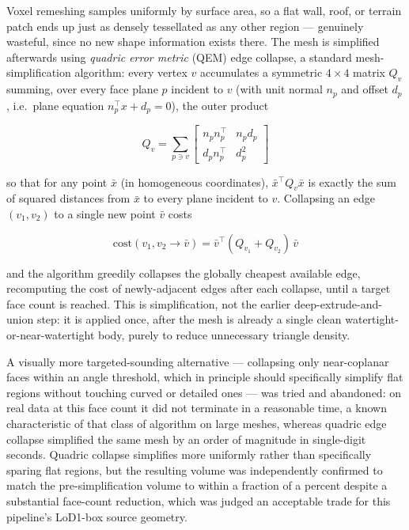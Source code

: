 \documentclass[11pt]{article}
\begin{document}
Voxel remeshing samples uniformly by surface area, so a flat wall, roof, or terrain patch ends
up just as densely tessellated as any other region --- genuinely wasteful, since no new shape
information exists there. The mesh is simplified afterwards using \emph{quadric error metric}
(QEM) edge collapse, a standard mesh-simplification algorithm: every vertex $v$ accumulates a
symmetric $4\times4$ matrix $Q_v$ summing, over every face plane $p$ incident to $v$ (with unit
normal $n_p$ and offset $d_p$, i.e.\ plane equation $n_p^\top x + d_p = 0$), the outer product

\begin{equation}
  Q_v = \sum_{p \ni v} \begin{bmatrix} n_p n_p^\top & n_p d_p \\ d_p n_p^\top & d_p^2 \end{bmatrix}
\end{equation}

so that for any point $\bar{x}$ (in homogeneous coordinates), $\bar{x}^\top Q_v \bar{x}$ is
exactly the sum of squared distances from $\bar{x}$ to every plane incident to $v$. Collapsing
an edge $(v_1, v_2)$ to a single new point $\bar{v}$ costs

\begin{equation}
  \mathrm{cost}(v_1, v_2 \to \bar{v}) = \bar{v}^\top (Q_{v_1} + Q_{v_2})\, \bar{v}
\end{equation}

and the algorithm greedily collapses the globally cheapest available edge, recomputing the
cost of newly-adjacent edges after each collapse, until a target face count is reached. This
is simplification, not the earlier deep-extrude-and-union step: it is applied once, after the
mesh is already a single clean watertight-or-near-watertight body, purely to reduce
unnecessary triangle density.

A visually more targeted-sounding alternative --- collapsing only near-coplanar faces within an
angle threshold, which in principle should specifically simplify flat regions without touching
curved or detailed ones --- was tried and abandoned: on real data at this face count it did not
terminate in a reasonable time, a known characteristic of that class of algorithm on large
meshes, whereas quadric edge collapse simplified the same mesh by an order of magnitude in
single-digit seconds. Quadric collapse simplifies more uniformly rather than specifically
sparing flat regions, but the resulting volume was independently confirmed to match the
pre-simplification volume to within a fraction of a percent despite a substantial face-count
reduction, which was judged an acceptable trade for this pipeline's LoD1-box source geometry.
\end{document}

